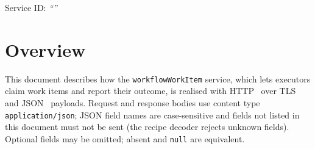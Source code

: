 \documentclass[a4paper]{arrowhead}
\begin{document}
\ArrowheadSetup

\begin{center}
  \vspace*{1cm}
  \huge{\arrowtitle}

  \vspace*{0.2cm}
  \LARGE{\arrowtype}
  \vspace*{1cm}

  \Large{Service ID: \textit{``\arrowid''}}
  \vspace*{\fill}

  

  \vspace*{1cm}
  \vspace*{\fill}

  \begin{abstract}
    This document describes the HTTP/TLS/JSON interface of the \texttt{workflowWorkItem} service of the Eclipse Arrowhead workflow support systems, service version 1.0.0, documentation edition 5.4.0. It realises the abstract operations of the \texttt{workflowWorkItem} SD.
  \end{abstract}

  \vspace*{1cm}
\end{center}

\newpage

\tableofcontents
\newpage

\section{Overview}
\label{sec:overview}
This document describes how the \texttt{workflowWorkItem} service, which lets executors claim work items and report their outcome, is realised with HTTP~\cite{rfc9110}
over TLS~\cite{rfc8446} and JSON~\cite{rfc8259} payloads. Request and response bodies use content type
\texttt{application/json}; JSON field names are case-sensitive and fields not listed in this document must not be sent
(the recipe decoder rejects unknown fields). Optional fields may be omitted; absent and \texttt{null} are equivalent.
\end{document}
